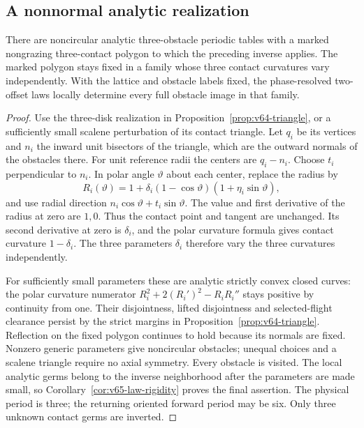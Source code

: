 \subsection{A nonnormal analytic realization}

\begin{proposition}
\label{prop:v65-nonnormal-rigidity}
There are noncircular analytic three-obstacle periodic tables with a
marked nongrazing three-contact polygon to which the preceding inverse
applies.  The marked polygon stays fixed in a family whose three contact
curvatures vary independently.  With the lattice and obstacle labels
fixed, the phase-resolved two-offset laws locally determine every full
obstacle image in that family.
\end{proposition}
\begin{proof}
Use the three-disk realization in Proposition~\ref{prop:v64-triangle},
or a sufficiently small scalene perturbation of its contact triangle.
Let $q_i$ be its vertices and $n_i$ the inward unit bisectors of the
triangle, which are the outward normals of the obstacles there.
For unit reference radii the centers are $q_i-n_i$.
Choose $t_i$ perpendicular to $n_i$.  In polar angle $\vartheta$
about each center, replace the radius by
\[
 R_i(\vartheta)=1+\delta_i(1-\cos\vartheta)
                                  (1+\eta_i\sin\vartheta),
\]
and use radial direction $n_i\cos\vartheta+t_i\sin\vartheta$.
The value and first derivative of the radius at zero are $1,0$.
Thus the contact point and tangent are unchanged.  Its second derivative
at zero is $\delta_i$, and the polar curvature formula gives contact
curvature $1-\delta_i$.  The three parameters $\delta_i$ therefore
vary the three curvatures independently.

For sufficiently small parameters these are analytic strictly convex
closed curves: the polar curvature numerator
$R_i^2+2(R_i')^2-R_iR_i''$ stays positive by continuity from one.
Their disjointness, lifted disjointness and selected-flight clearance
persist by the strict margins in Proposition~\ref{prop:v64-triangle}.
Reflection on the fixed polygon continues to hold because its normals
are fixed.  Nonzero generic parameters give noncircular obstacles;
unequal choices and a scalene triangle require no axial symmetry.
Every obstacle is visited.  The local analytic germs belong to the
inverse neighborhood after the parameters are made small, so
Corollary~\ref{cor:v65-law-rigidity} proves the final assertion.
The physical period is three; the returning oriented forward period may
be six.  Only three unknown contact germs are inverted.
\end{proof}

